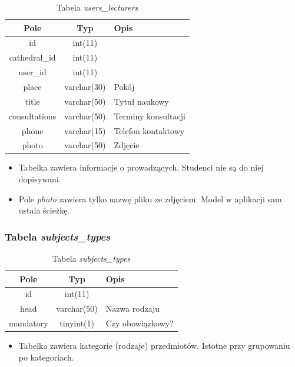 \documentclass[a4paper,12pt,oneside]{report}
\begin{document}
\begin{table}[h]
  \centering
  \begin{tabular}{|c|c|l|}\hline
  Pole & Typ & Opis \\\hline
  id            & int(11)     & \\
  cathedral\_id & int(11)     & \\
  user\_id      & int(11)     & \\
  place         & varchar(30) & Pokój \\
  title         & varchar(50) & Tytuł naukowy \\
  consultations & varchar(50) & Terminy konsultacji \\
  phone         & varchar(15) & Telefon kontaktowy \\
  photo         & varchar(50) & Zdjęcie \\\hline
  \end{tabular}
  \caption{Tabela \emph{users\_lecturers}\label{tab:users_lecturers}}
\end{table}
\begin{itemize}
  \item Tabelka zawiera informacje o prowadzących. Studenci nie są do niej dopisywani.
  \item Pole \emph{photo} zawiera tylko nazwę pliku ze zdjęciem. Model w aplikacji sam ustala ścieżkę.
\end{itemize}

\subsubsection{Tabela \emph{subjects\_types}}
\label{subsub:subjects_types}

\begin{table}[h]
  \centering
  \begin{tabular}{|c|c|l|}\hline
  Pole & Typ & Opis \\\hline
  id        & int(11)     & \\
  head      & varchar(50) & Nazwa rodzaju \\
  mandatory & tinyint(1)  & Czy obowiązkowy? \\\hline
  \end{tabular}
  \caption{Tabela \emph{subjects\_types}\label{tab:subjects_types}}
\end{table}
\begin{itemize}
  \item Tabelka zawiera kategorie (rodzaje) przedmiotów. Istotne przy grupowaniu po kategoriach.
\end{itemize}
\end{document}
